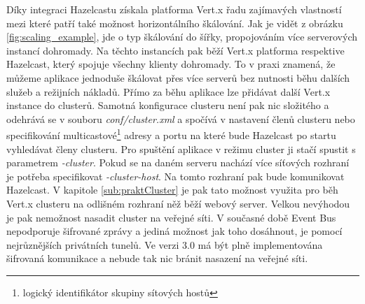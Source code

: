 Díky integraci Hazelcastu získala platforma Vert.x řadu zajímavých vlastností mezi které patří také možnost horizontálního škálování. Jak je vidět z obrázku \ref{fig:scaling_example}, jde o typ škálování do šířky, propojováním více serverových instancí dohromady. Na těchto instancích pak běží Vert.x platforma respektive Hazelcast, který spojuje všechny klienty dohromady. To v praxi znamená, že můžeme aplikace jednoduše škálovat přes více serverů bez nutnosti běhu dalších služeb a režijních nákladů. Přímo za běhu aplikace lze přidávat další Vert.x instance do clusterů. Samotná konfigurace clusteru není pak nic složitého a odehrává se v souboru \emph{conf/cluster.xml} a spočívá v nastavení členů clusteru nebo specifikování multicastové\footnote{logický identifikátor skupiny sítových hostů} adresy a portu na které bude Hazelcast po startu vyhledávat členy clusteru. Pro spuštění aplikace v režimu cluster ji stačí spustit s parametrem \emph{-cluster}. Pokud se na daném serveru nachází více síťových rozhraní je potřeba specifikovat \emph{-cluster-host}. Na tomto rozhraní pak bude komunikovat Hazelcast. V kapitole \ref{sub:praktCluster} je pak tato možnost využita pro běh Vert.x clusteru na odlišném rozhraní něž běží webový server.
Velkou nevýhodou je pak nemožnost nasadit cluster na veřejné síti. V současné době Event Bus nepodporuje šifrované zprávy a jediná možnost jak toho dosáhnout, je pomocí nejrůznějších privátních tunelů. Ve verzi 3.0 má být plně implementována šifrovaná komunikace a nebude tak nic bránit nasazení na veřejné síti.

